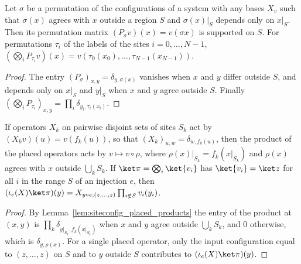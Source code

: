 \begin{lemma}
    \label{lem:qc_permutation_layers}
    \leanok
    Let $\sigma$ be a permutation of the configurations of a system with any
    bases $X_v$ such that $\sigma(x)$ agrees with $x$ outside a region $S$ and
    $\sigma(x)|_S$ depends only on $x|_S$. Then its permutation matrix
    $(P_\sigma v)(x)=v(\sigma x)$ is supported on $S$. For permutations
    $\tau_i$ of the labels of the sites $i=0,\dots,N-1$,
    $(\bigotimes_i P_{\tau_i}v)(x)=v(\tau_0(x_0),\dots,\tau_{N-1}(x_{N-1}))$.
\end{lemma}
\begin{proof}
    \leanok
    The entry $(P_\sigma)_{x,y}=\delta_{y,\sigma(x)}$ vanishes when $x$ and $y$
    differ outside $S$, and depends only on $x|_S$ and $y|_S$ when $x$ and
    $y$ agree outside $S$. Finally
    $(\bigotimes_i P_{\tau_i})_{x,y}=\prod_i\delta_{y_i,\tau_i(x_i)}$.
\end{proof}

\begin{lemma}
    \label{lem:qc_configuration_layers}
    \leanok
    If operators $X_k$ on pairwise disjoint sets of sites $S_k$ act by
    $(X_kv)(u)=v(f_k(u))$, so that $(X_k)_{u,w}=\delta_{w,f_k(u)}$, then the
    product of the placed operators acts by $v\mapsto v\circ\rho$, where
    $\rho(x)|_{S_k}=f_k(x|_{S_k})$ and $\rho(x)$ agrees with $x$ outside
    $\bigcup_k S_k$. If $\ket\pi=\bigotimes_i\ket{v_i}$ has $\ket{v_i}=\ket z$
    for all $i$ in the range $S$ of an injection $e$, then
    $(\iota_e(X)\ket\pi)(y)=X_{y\circ e,(z,\dots,z)}\prod_{i\notin S}v_i(y_i)$.
\end{lemma}
\begin{proof}
    \leanok
    By Lemma~\ref{lem:siteconfig_placed_products} the entry of the product at
    $(x,y)$ is
    $\prod_k\delta_{y|_{S_k},f_k(x|_{S_k})}$ when $x$ and $y$ agree outside
    $\bigcup_k S_k$, and $0$ otherwise, which is $\delta_{y,\rho(x)}$. For a
    single placed operator, only the input configuration equal to
    $(z,\dots,z)$ on $S$ and to $y$ outside $S$ contributes to
    $(\iota_e(X)\ket\pi)(y)$.
\end{proof}
